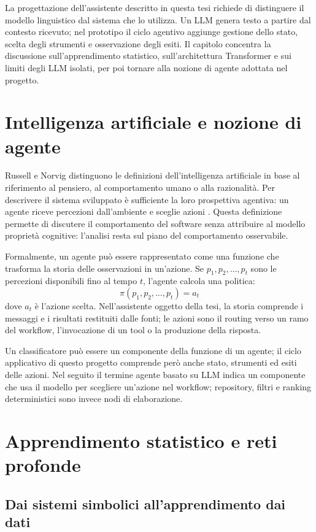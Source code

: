 La progettazione dell'assistente descritto in questa tesi richiede di distinguere
il modello linguistico dal sistema che lo utilizza. Un LLM genera testo a partire
dal contesto ricevuto; nel prototipo il ciclo agentivo aggiunge gestione dello
stato, scelta degli strumenti e osservazione degli esiti. Il capitolo
concentra la discussione sull'apprendimento statistico, sull'architettura
Transformer e sui limiti degli LLM isolati, per poi tornare alla nozione di
agente adottata nel progetto.

\section{Intelligenza artificiale e nozione di agente}

Russell e Norvig distinguono le definizioni dell'intelligenza artificiale in base
al riferimento al pensiero, al comportamento umano o alla razionalità. Per
descrivere il sistema sviluppato è sufficiente la loro prospettiva agentiva: un
agente riceve percezioni dall'ambiente e sceglie azioni \cite{russellNorvigAIMA}.
Questa definizione permette di discutere il comportamento del software senza
attribuire al modello proprietà cognitive: l'analisi resta sul piano del
comportamento osservabile.

Formalmente, un agente può essere rappresentato come una funzione che trasforma
la storia delle osservazioni in un'azione. Se $p_1, p_2, \ldots, p_t$ sono le
percezioni disponibili fino al tempo $t$, l'agente calcola una politica:
\[
    \pi(p_1, p_2, \ldots, p_t) = a_t
\]
dove $a_t$ è l'azione scelta. Nell'assistente oggetto della tesi, la storia
comprende i messaggi e i risultati restituiti dalle fonti; le azioni sono il
routing verso un ramo del workflow, l'invocazione di un tool o la produzione
della risposta.

Un classificatore può essere un componente della funzione di un agente; il
ciclo applicativo di questo progetto comprende però anche stato, strumenti ed
esiti delle azioni.
Nel seguito il termine agente basato su LLM indica un componente che usa il
modello per scegliere un'azione nel workflow; repository, filtri e ranking
deterministici sono invece nodi di elaborazione.

\section{Apprendimento statistico e reti profonde}

\subsection{Dai sistemi simbolici all'apprendimento dai dati}

